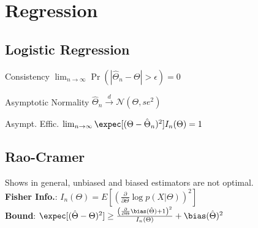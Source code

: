 \section{Regression}

\begin{comment}
\subsection*{Estimation}
Consistency: $\hat{\theta_n} \stackrel{\text{\tiny P}}{\rightarrow} \theta$,
i.e. $\forall\epsilon P \{|\hat{\theta_n}-\theta| \geq\epsilon\} \stackrel{\tiny n \to\infty}{\longrightarrow} 0 $\\
Asymptotic normality: $\sqrt{N}(\theta - \hat{\theta_n}) \to \mathcal{N}(0, J^{-1}IJ^{-1})$ \\
Asymptotic efficiency: $\hat{\theta_n}$ has the smallest variance among all possible consistent estimators (for large enough N), i.e. $\lim_{n\to\infty} (V[\hat{\theta_n}]I(\theta))^{-1} = 1$
	$\hat{\theta}_{MAP} := \argmax_\theta \left \{ \sum_{i=1}^n log(p(x_i | \theta) + log(p(\theta)) \right\}$
\end{comment}

\subsection*{Logistic Regression}
\begin{compactdesc}
	\item[Consistency] $\lim_{n \rightarrow \infty} \Pr(|\hat{\Theta}_n - \Theta| > \epsilon) = 0$
    \item[Asymptotic Normality] $\hat{\Theta}_n \overset{d}{\rightarrow} \mathcal{N}(\Theta, se^2)$
    \item[Asympt. Effic.] $\lim_{n \rightarrow \infty} \expec [(\Theta - \hat{\Theta}_n)^2] I_n(\Theta) = 1$
\end{compactdesc}

\subsection*{Rao-Cramer}
Shows in general, unbiased and biased estimators are not optimal.\\
\textbf{Fisher Info.}: $I_{n}(\Theta) = E\left[\left(\frac{\partial}{\partial \Theta}\log p(X | \Theta)\right)^{2}\right]$ \\
\textbf{Bound}: $\expec[(\hat{\Theta}- \Theta)^2] \geq \frac{\left(\frac{\partial}{\partial \Theta}\bias(\hat{\Theta})+1\right)^2}{I_n(\Theta)} + \bias(\hat{\Theta})^2$

